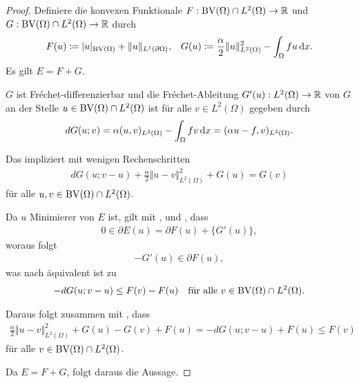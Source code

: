 \begin{proof}
  Definiere die konvexen Funktionale $F:\textup{BV}(\Omega)\cap L^2(\Omega)\to \mathbb{R}$
  und 
  $G:\textup{BV}(\Omega)\cap L^2(\Omega)\to \mathbb{R}$ durch
  \begin{align*}
    F(u) &\coloneqq |u|_{\textup{BV}(\Omega)} + \Vert u \Vert_{L^1(\partial\Omega)},&
    G(u)\coloneqq \frac{\alpha}{2}\Vert u\Vert_{L^2(\Omega)}^2 -
    \int_\Omega f u\,\mathrm{d}x.
  \end{align*}
  Es gilt $E= F+G$.

  $G$ ist Fr\'echet-differenzierbar und die Fr\'echet-Ableitung $G'(u):
  L^2(\Omega)\to\mathbb{R}$ von $G$ an der
  Stelle
  $u\in \textup{BV}(\Omega)\cap L^2(\Omega)$ ist 
  für alle $v\in L^2(\Omega)$ gegeben durch
  \begin{align*}
    dG(u;v) = \alpha (u,v)_{L^2(\Omega)} - \int_\Omega f v\,\mathrm{d}x 
    = (\alpha u-f ,v)_{L^2(\Omega)}.
  \end{align*}

  Das impliziert mit wenigen Rechenschritten
  \begin{align}\label{eq:strongConvexityG}
    dG(u;v-u) +\frac{\alpha}{2}\Vert u-v\Vert^2_{L^2(\Omega)}+G(u) 
    =
    G(v)
  \end{align}
  für alle $u,v\in \textup{BV}(\Omega)\cap L^2(\Omega)$.

  Da $u$ Minimierer von $E$ ist, gilt mit ,
   und , dass
  \begin{align*}
    0\in\partial E(u) = \partial F(u)+\{G'(u)\},
  \end{align*}
  woraus folgt 
  \begin{align*}
    -G'(u)\in\partial F(u),
  \end{align*}
  was nach  äquivalent ist zu
  \begin{align*}
    -dG(u;v-u)\leq F(v)-F(u)\quad\text{für alle }v\in\textup{BV}(\Omega)\cap
    L^2(\Omega).
  \end{align*}

  Daraus folgt zusammen mit , dass
  \begin{align*}
    \frac{\alpha}{2}\Vert u-v\Vert_{L^2(\Omega)}^2+G(u)-G(v)+F(u)
    = -dG(u;v-u)+F(u)\leq F(v)
  \end{align*}
  für alle $v\in \textup{BV}(\Omega)\cap L^2(\Omega)$.

  Da $E=F+G$, folgt daraus die Aussage.
\end{proof}
